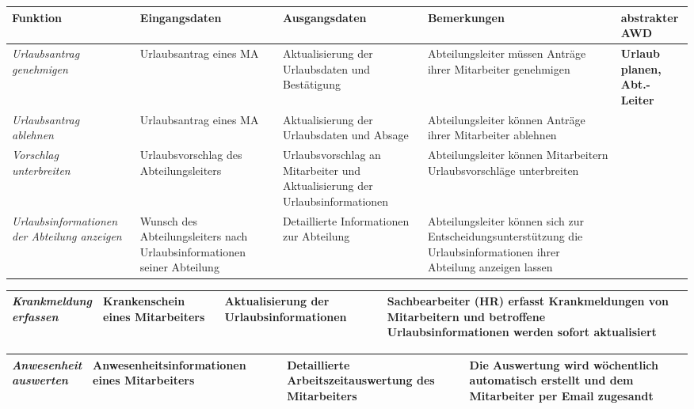 {
\hspace{-3,5cm}
\footnotesize
\begin{tabular}{|p{3cm}|p{4cm}|p{4cm}|p{4cm}|p{2cm}|}
	\hline 
		\textbf{Funktion	} &	
		\textbf{Eingangsdaten} &
		\textbf{Ausgangsdaten}& 
		\textbf{Bemerkungen}	&
		\textbf{abstrakter AWD} \\
	\hline \hline 
		\textit{Urlaubsantrag \newline genehmigen} &
		Urlaubsantrag eines MA &
		Aktualisierung der Urlaubsdaten und Best\"atigung &
		Abteilungsleiter m\"ussen Antr\"age ihrer Mitarbeiter genehmigen &
		\textbf{Urlaub \newline planen, \newline  Abt.-Leiter } \\
	\cline{1-4}
		\textit{Urlaubsantrag \newline ablehnen} &
		Urlaubsantrag eines MA &
		Aktualisierung der Urlaubsdaten und Absage&
		Abteilungsleiter k\"onnen Antr\"age ihrer Mitarbeiter ablehnen &
		\\
	\cline{1-4}
		\textit{Vorschlag \newline unterbreiten} &
		Urlaubsvorschlag des Abteilungsleiters &
		Urlaubsvorschlag an Mitarbeiter und Aktualisierung der Urlaubsinformationen &
		Abteilungsleiter k\"onnen Mitarbeitern Urlaubsvorschl\"age unterbreiten &
		\\
	\cline{1-4}
		\textit{Urlaubsinformationen der Abteilung an\-zeigen} &
		Wunsch des Abteilungsleiters nach Urlaubsinformationen seiner Abteilung &
		Detaillierte Informationen zur Abteilung &
		Abteilungsleiter k\"onnen sich zur Entscheidungs\-unterst\"utzung die Urlaubs\-informationen ihrer Abteilung anzeigen lassen &
		\\
	\hline
\end{tabular}
}

{
\vspace{0,5cm}
\hspace{-3,5cm}
\footnotesize
\begin{tabular}{|p{3cm}|p{4cm}|p{4cm}|p{4cm}|p{2cm}|}
	\hline 
		\textit{Krankmeldung \newline erfassen} &
		Krankenschein eines Mitarbeiters &
		Aktualisierung der Urlaubsinformationen &
		Sachbearbeiter (HR) erfasst Krankmeldungen von Mitarbeitern und betroffene Urlaubsinformationen werden sofort aktualisiert &
		 \\
	\hline	
\end{tabular}
}

{
\vspace{0,5cm}
\hspace{-3,5cm}
\footnotesize
\begin{tabular}{|p{3cm}|p{4cm}|p{4cm}|p{4cm}|p{2cm}|}
	\hline 
		\textit{Anwesenheit \newline auswerten} &
		Anwesenheitsinformationen eines Mitarbeiters &
		Detaillierte Arbeitszeit\-aus\-wertung  des Mitarbeiters &
		Die Auswertung wird w\"ochentlich automatisch erstellt und dem Mitarbeiter per Email zugesandt &
		 \\
	\hline	
\end{tabular}
}

